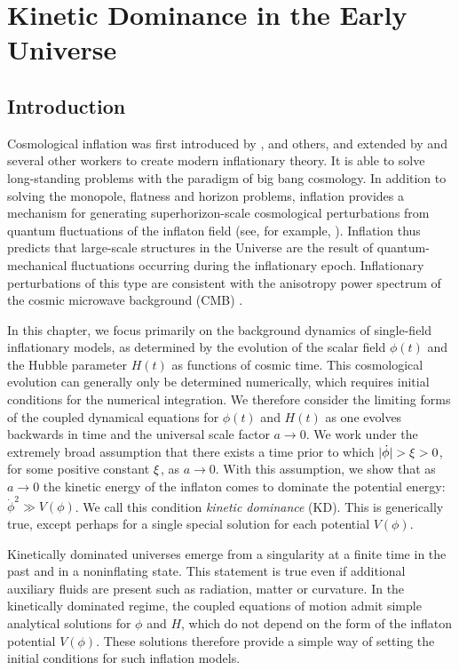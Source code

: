 \chapter{Kinetic Dominance in the Early Universe}
\label{chap:kd}

\section{Introduction}

Cosmological inflation was first introduced by
\citet{starobinskii_spectrum_1979}, \citet{guth_inflationary_1981} and
others, and extended by \citet{linde_1982} and several other workers
to create modern inflationary theory. It is able to solve
long-standing problems with the paradigm of big bang cosmology. In
addition to solving the monopole, flatness and horizon problems,
inflation provides a mechanism for generating superhorizon-scale
cosmological perturbations from quantum fluctuations of the inflaton
field (see, for example, \citet{mukhanov_theory_1992}). Inflation thus
predicts that large-scale structures in the Universe are the result of
quantum-mechanical fluctuations occurring during the inflationary
epoch. Inflationary perturbations of this type are consistent with the
anisotropy power spectrum of the cosmic microwave background (CMB)
\citep{hinshaw_nine-year_2012,planck_collaboration_planck_2013}.

In this chapter, we focus primarily on the background dynamics of single-field inflationary models, as determined by the evolution of the scalar field $\phi(t)$ and the Hubble parameter $H(t)$ as functions of cosmic time.  This cosmological evolution can generally only be determined numerically, which requires initial conditions for the numerical integration.  We therefore consider the limiting forms of the coupled dynamical equations for $\phi(t)$ and $H(t)$ as one evolves backwards in time and the universal scale factor $a\to 0$. We work under the extremely broad assumption that there exists a time prior to which $|\dot{\phi}| > \xi > 0$, for some positive constant $\xi$, as $a \to 0$.  With this assumption, we show that as $a\to 0$ the kinetic energy of the inflaton comes to dominate the potential energy: $\dot{\phi}^2\gg V(\phi)$. We call this condition {\em kinetic dominance\/} (KD). This is generically true, except perhaps for a single special solution for each potential $V(\phi)$.

Kinetically dominated universes emerge from a singularity at a finite time in the past and in a noninflating state. This statement is true even if additional auxiliary fluids are present such as radiation, matter or curvature.  In the kinetically dominated regime, the coupled equations of motion admit simple analytical solutions for $\phi$ and $H$, which do not depend on the form of the inflaton potential $V(\phi)$.  These solutions therefore provide a simple way of setting the initial conditions for such inflation models.

